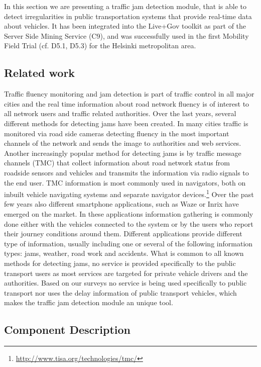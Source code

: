In this section we are presenting a traffic jam detection module, that
is able to detect irregularities in public transportation systems that
provide real-time data about vehicles. It has been integrated into the
Live+Gov toolkit as part of the Server Side Mining Service (C9), and
was successfully used in the first Mobility Field Trial (cf. D5.1,
D5.3) for the Helsinki metropolitan area.

\subsection{Related work}

Traffic fluency monitoring and jam detection is part of traffic
control in all major cities and the real time information about road
network fluency is of interest to all network users and traffic
related authorities. Over the last years, several different methods
for detecting jams have been created. In many cities traffic is
monitored via road side cameras detecting fluency in the most
important channels of the network and sends the image to authorities
and web services. Another increasingly popular method for detecting
jams is by traffic message channels (TMC) that collect information
about road network status from roadside sensors and vehicles and
transmits the information via radio signals to the end user. TMC
information is most commonly used in navigators, both on inbuilt
vehicle navigating systems and separate navigator
devices.\footnote{\url{http://www.tisa.org/technologies/tmc/}} Over
the past few years also different smartphone applications, such as
Waze or Inrix have emerged on the market. In these applications
information gathering is commonly done either with the vehicles
connected to the system or by the users who report their journey
conditions around them. Different applications provide different type
of information, usually including one or several of the following
information types: jams, weather, road work and accidents.  What is
common to all known methods for detecting jams, no service is provided
specifically to the public transport users as most services are
targeted for private vehicle drivers and the authorities. Based on our
surveys no service is being used specifically to public transport nor
uses the delay information of public transport vehicles, which makes
the traffic jam detection module an unique tool.

\subsection{Component Description}

